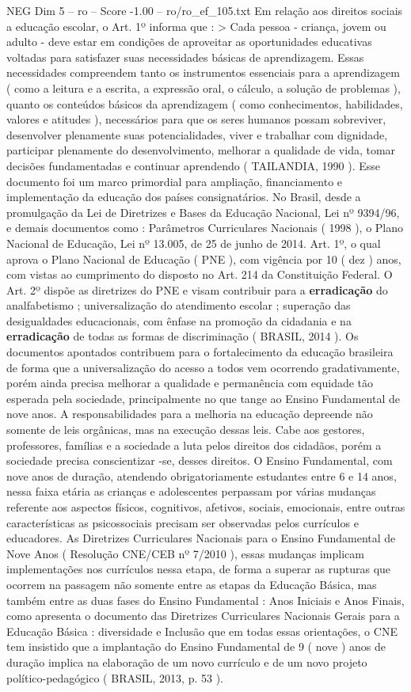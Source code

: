 \begin{textsample}{NEG Dim 5 – ro – Score -1.00 – ro/ro\_ef\_105.txt}
Em relação aos direitos sociais a educação escolar, o Art. 1º informa que : > Cada pessoa - criança, jovem ou adulto - deve estar em condições de aproveitar as oportunidades educativas voltadas para satisfazer suas necessidades básicas de aprendizagem.
Essas necessidades compreendem tanto os instrumentos essenciais para a aprendizagem ( como a leitura e a escrita, a expressão oral, o cálculo, a solução de problemas ), quanto os conteúdos básicos da aprendizagem ( como conhecimentos, habilidades, valores e atitudes ), necessários para que os seres humanos possam sobreviver, desenvolver plenamente suas potencialidades, viver e trabalhar com dignidade, participar plenamente do desenvolvimento, melhorar a qualidade de vida, tomar decisões fundamentadas e continuar aprendendo ( TAILANDIA, 1990 ).
Esse documento foi um marco primordial para ampliação, financiamento e implementação da educação dos países consignatários.
No Brasil, desde a promulgação da Lei de Diretrizes e Bases da Educação Nacional, Lei nº 9394/96, e demais documentos como : Parâmetros Curriculares Nacionais ( 1998 ), o Plano Nacional de Educação, Lei nº 13.005, de 25 de junho de 2014.
Art. 1º, o qual aprova o Plano Nacional de Educação ( PNE ), com vigência por 10 ( dez ) anos, com vistas ao cumprimento do disposto no Art. 214 da Constituição Federal.
O Art. 2º dispõe as diretrizes do PNE e visam contribuir para a \textbf{erradicação} do analfabetismo ; universalização do atendimento escolar ; superação das desigualdades educacionais, com ênfase na promoção da cidadania e na \textbf{erradicação} de todas as formas de discriminação ( BRASIL, 2014 ).
Os documentos apontados contribuem para o fortalecimento da educação brasileira de forma que a universalização do acesso a todos vem ocorrendo gradativamente, porém ainda precisa melhorar a qualidade e permanência com equidade tão esperada pela sociedade, principalmente no que tange ao Ensino Fundamental de nove anos.
A responsabilidades para a melhoria na educação depreende não somente de leis orgânicas, mas na execução dessas leis.
Cabe aos gestores, professores, famílias e a sociedade a luta pelos direitos dos cidadãos, porém a sociedade precisa conscientizar -se, desses direitos.
O Ensino Fundamental, com nove anos de duração, atendendo obrigatoriamente estudantes entre 6 e 14 anos, nessa faixa etária as crianças e adolescentes perpassam por várias mudanças referente aos aspectos físicos, cognitivos, afetivos, sociais, emocionais, entre outras características as psicossociais precisam ser observadas pelos currículos e educadores.
As Diretrizes Curriculares Nacionais para o Ensino Fundamental de Nove Anos ( Resolução CNE/CEB nº 7/2010 ), essas mudanças implicam implementações nos currículos nessa etapa, de forma a superar as rupturas que ocorrem na passagem não somente entre as etapas da Educação Básica, mas também entre as duas fases do Ensino Fundamental : Anos Iniciais e Anos Finais, como apresenta o documento das Diretrizes Curriculares Nacionais Gerais para a Educação Básica : diversidade e Inclusão que em todas essas orientações, o CNE tem insistido que a implantação do Ensino Fundamental de 9 ( nove ) anos de duração implica na elaboração de um novo currículo e de um novo projeto político-pedagógico ( BRASIL, 2013, p. 53 ).

\end{textsample}
